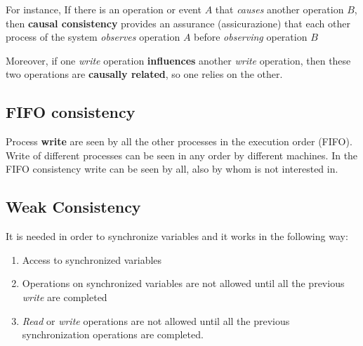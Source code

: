 For instance, If there is an operation or event \(A\) that \textit{causes} another operation \(B\), then \textbf{causal consistency} provides an assurance (assicurazione) that each other process of the system \textit{observes} operation \(A\) before \textit{observing} operation \(B\)

Moreover, if one \textit{write} operation \textbf{influences} another \textit{write} operation, then these two operations are \textbf{causally related}, so one relies on the other.

\subsection{FIFO consistency}
Process \textbf{write} are seen by all the other processes in the execution order (FIFO). Write of different processes can be seen in any order by different machines. In the FIFO consistency write can be seen by all, also by whom is not interested in. 

\subsection{Weak Consistency}
It is needed in order to synchronize variables and it works in the following way:
\begin{enumerate}
    \item Access to synchronized variables
    \item Operations on synchronized variables are not allowed until all the previous \textit{write} are completed
    \item \textit{Read} or \textit{write} operations are not allowed until all the previous synchronization operations are completed.
\end{enumerate}

